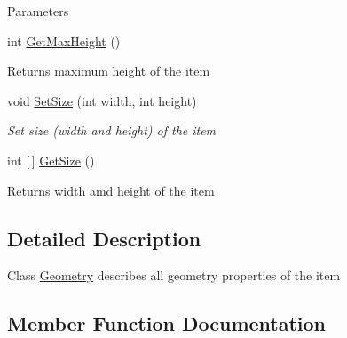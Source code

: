 \begin{DoxyCompactItemize}
\begin{DoxyCompactList}
\begin{DoxyParams}{Parameters}
\hline
\end{DoxyParams}
\end{DoxyCompactList}\item 
\mbox{\label{class_space_v_i_l_1_1_core_1_1_geometry_ab20480edab9a0fa7073aaf4c8fef77a4}} 
int \mbox{\hyperlink{class_space_v_i_l_1_1_core_1_1_geometry_ab20480edab9a0fa7073aaf4c8fef77a4}{Get\+Max\+Height}} ()
\begin{DoxyCompactList}\small\item\em \begin{DoxyReturn}{Returns}
maximum height of the item 
\end{DoxyReturn}
\end{DoxyCompactList}\item 
void \mbox{\hyperlink{class_space_v_i_l_1_1_core_1_1_geometry_a0f6992c19bb5f6776d278801152c5245}{Set\+Size}} (int width, int height)
\begin{DoxyCompactList}\small\item\em Set size (width and height) of the item \end{DoxyCompactList}\item 
\mbox{\label{class_space_v_i_l_1_1_core_1_1_geometry_a7d84692669d47529e016796bb1210961}} 
int \mbox{[}$\,$\mbox{]} \mbox{\hyperlink{class_space_v_i_l_1_1_core_1_1_geometry_a7d84692669d47529e016796bb1210961}{Get\+Size}} ()
\begin{DoxyCompactList}\small\item\em \begin{DoxyReturn}{Returns}
width amd height of the item 
\end{DoxyReturn}
\end{DoxyCompactList}\end{DoxyCompactItemize}


\subsection{Detailed Description}
Class \mbox{\hyperlink{class_space_v_i_l_1_1_core_1_1_geometry}{Geometry}} describes all geometry properties of the item 



\subsection{Member Function Documentation}
\mbox{\label{class_space_v_i_l_1_1_core_1_1_geometry_a0f6992c19bb5f6776d278801152c5245}} 
